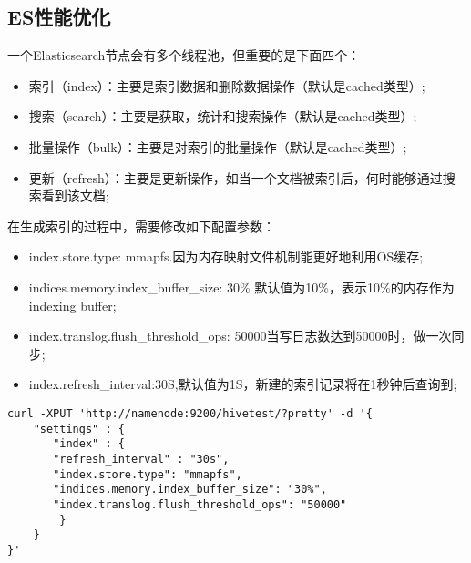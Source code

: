 \subsection{ES性能优化}
一个Elasticsearch节点会有多个线程池，但重要的是下面四个：
\begin{itemize}
\item 索引（index）：主要是索引数据和删除数据操作（默认是cached类型）;
\item 搜索（search）：主要是获取，统计和搜索操作（默认是cached类型）;
\item 批量操作（bulk）：主要是对索引的批量操作（默认是cached类型）;
\item 更新（refresh）：主要是更新操作，如当一个文档被索引后，何时能够通过搜索看到该文档;
\end{itemize}
\par 在生成索引的过程中，需要修改如下配置参数：
\begin{itemize}
\item index.store.type: mmapfs.因为内存映射文件机制能更好地利用OS缓存;
\item indices.memory.index\_buffer\_size: 30\% 默认值为10\%，表示10\%的内存作为indexing buffer;
\item index.translog.flush\_threshold\_ops: 50000当写日志数达到50000时，做一次同步;
\item index.refresh\_interval:30S,默认值为1S，新建的索引记录将在1秒钟后查询到;
\end{itemize}
\begin{verbatim}
curl -XPUT 'http://namenode:9200/hivetest/?pretty' -d '{
    "settings" : {
       "index" : {
       "refresh_interval" : "30s",
       "index.store.type": "mmapfs",
       "indices.memory.index_buffer_size": "30%",
       "index.translog.flush_threshold_ops": "50000"
        }
    }
}'
\end{verbatim}


